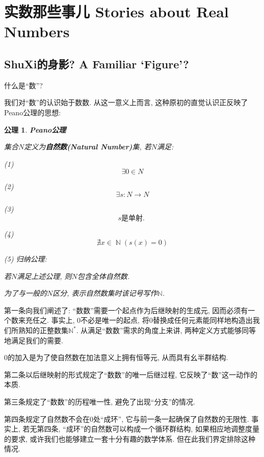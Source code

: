 \documentclass[UTF8]{ctexart}
\newcommand{\<}{\langle}
\renewcommand{\>}{\rangle}
\DeclareMathOperator{\N}{\mathbb{N}}
\newtheorem{axm}{公理}
\begin{document}
    \section{实数那些事儿 Stories about Real Numbers}

        \subsection{ShuXi的身影? A Familiar `Figure'? }

            什么是``数''? 

            我们对``数''的认识始于数数. 从这一意义上而言, 这种原初的直觉认识正反映了Peano公理的思想: 
            
            \begin{axm}
                \textbf{Peano公理}
                
                集合$N$定义为\textbf{自然数(Natural Number)}集, 若$N$满足: 
                
                (1)\[\exists 0\in N\]
                
                (2)\[\exists s:N\to N\]
                
                (3)\[s\text{是单射. }\]
                
                (4)\[\nexists x\in\N(s(x)=0)\]
                
                (5) 归纳公理: 
                
                若$N$满足上述公理, 则$N$包含全体自然数. 
            
                为了与一般的$N$区分, 表示自然数集时该记号写作$\mathbb{N}$. 
            \end{axm}
            
            第一条向我们阐述了: “数数”需要一个起点作为后继映射的生成元, 因而必须有一个数来充任之. 事实上, $0$不必是唯一的起点, 将$0$替换成任何元素能同样地构造出我们所熟知的正整数集$\mathbb{N}^*$. 从满足“数数”需求的角度上来讲, 两种定义方式能够同等地满足我们的需要. 
            
            $0$的加入是为了使自然数在加法意义上拥有恒等元, 从而具有幺半群结构. 
            
            第二条以后继映射的形式规定了“数数”的唯一后继过程, 它反映了“数”这一动作的本质. 
            
            第三条规定了“数数”的历程唯一性, 避免了出现“分支”的情况. 
            
            第四条规定了自然数不会在$0$处“成环”, 它与前一条一起确保了自然数的无限性. 事实上, 若无第四条, “成环”的自然数可以构成一个循环群结构, 如果相应地调整度量的要求, 或许我们也能够建立一套十分有趣的数学体系. 但在此我们界定排除这种情况. 
            
\end{document}
